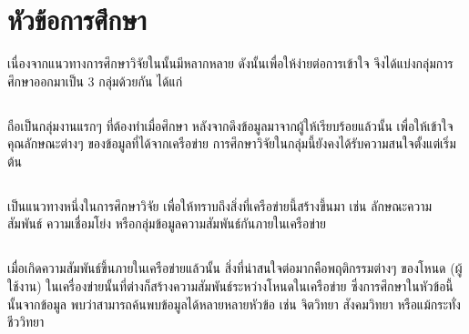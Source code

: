 \section{หัวข้อการศึกษา}

เนื่องจากแนวทางการศึกษาวิจัยใน{\OSN}นั้นมีหลากหลาย ดังนั้นเพื่อให้ง่ายต่อการเข้าใจ 
จึงได้แบ่งกลุ่มการศึกษาออกมาเป็น 3 กลุ่มด้วยกัน ได้แก่

\subsection{\STA} ถือเป็นกลุ่มงานแรกๆ ที่ต้องทำเมื่อศึกษา{\OSN} 
หลังจากดึงข้อมูลมาจากผู้ให้{\SNS}เรียบร้อยแล้วนั้น เพื่อให้เข้าใจคุณลักษณะต่างๆ 
ของข้อมูลที่ได้จากเครือข่าย การศึกษาวิจัยในกลุ่มนี้ยังคงได้รับความสนใจตั้งแต่เริ่มต้น 

\subsection{\SDA} เป็นแนวทางหนึ่งในการศึกษาวิจัย 
เพื่อให้ทราบถึงสิ่งที่เครือข่ายนี้สร้างขึ้นมา เช่น ลักษณะความสัมพันธ์ ความเชื่อมโย่ง 
หรือกลุ่มข้อมูลความสัมพันธ์กันภายในเครือข่าย

\subsection{\SIA} 
เมื่อเกิดความสัมพันธ์ขึ้นภายในเครือข่ายแล้วนั้น
สิ่งที่น่าสนใจต่อมากคือพฤติกรรมต่างๆ ของโหนด (ผู้ใช้งาน) 
ในเครื่องข่ายนั้นที่ต่างก็สร้างความสัมพันธ์ระหว่างโหนดในเครือข่าย 
ซึ่งการศึกษาในหัวข้อนี้นั้นจากข้อมูล พบว่าสามารถค้นพบข้อมูลได้หลายหลายหัวข้อ เช่น 
จิตวิทยา สังคมวิทยา หรือแม้กระทั่งชีววิทยา 